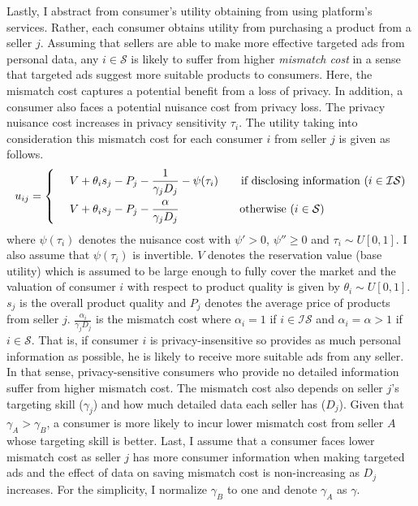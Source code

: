 \documentclass[12pt]{article}
\begin{document}
Lastly, I abstract from consumer's utility obtaining from using platform's services. Rather, each consumer obtains utility from purchasing a product from a seller $j$. Assuming that sellers are able to make more effective targeted ads from personal data, any $i \in \mathcal{S}$ is likely to suffer from higher \textit{mismatch cost} in a sense that targeted ads suggest more suitable products to consumers. Here, the mismatch cost captures a potential benefit from a loss of privacy. In addition, a consumer also faces a potential nuisance cost from privacy loss. The privacy nuisance cost increases in privacy sensitivity $\tau_i$. The utility taking into consideration this mismatch cost for each consumer $i$ from seller $j$ is given as follows.
\begin{align}\label{consumer_utility_endogenous}
\begin{aligned}
u_{ij}= \begin{dcases}
&\,\,  V+\theta_i s_j - P_j -  \frac{1}{\gamma_j D_j}-\psi(\tau_i) \quad \quad  \text{if disclosing information ($i \in \mathcal{IS}$)}  \\
&\,\,  V+\theta_i s_j - P_j -  \frac{\alpha}{\gamma_j D_j} \quad\quad\quad\quad\quad\,\,  \text{otherwise ($i \in \mathcal{S}$)} 
\end{dcases}\end{aligned}
\end{align}
where $\psi(\tau_i)$ denotes the nuisance cost with $\psi'>0$, $\psi'' \geq 0$ and $\tau_i \sim U[0, 1]$. I also assume that $\psi(\tau_i)$ is invertible. $V$ denotes the reservation value (base utility) which is assumed to be large enough to fully cover the market and the valuation of consumer $i$ with respect to product quality is given by $\theta_i  \sim U[0, 1]$. $s_j$ is the overall product quality and $P_j$ denotes the average price of products from seller $j$. $ \frac{\alpha_i}{\gamma_jD_j}$ is the mismatch cost where $\alpha_i=1$ if $i \in \mathcal{IS}$ and $\alpha_i=\alpha>1$ if $i\in \mathcal{S}$. That is, if consumer $i$ is privacy-insensitive so provides as much personal information as possible, he is likely to receive more suitable ads from any seller. In that sense, privacy-sensitive consumers who provide no detailed information suffer from higher mismatch cost. The mismatch cost also depends on seller $j$'s targeting skill ($\gamma_j$) and how much detailed data each seller has ($D_j$). Given that $\gamma_A>\gamma_B$, a consumer is more likely to incur lower mismatch cost from seller $A$ whose targeting skill is better. Last, I assume that a consumer faces lower mismatch cost as seller $j$ has more consumer information when making targeted ads and the effect of data on saving mismatch cost is non-increasing as $D_j$ increases. For the simplicity, I normalize $\gamma_B$ to one and denote $\gamma_A$ as $\gamma$.
\end{document}
